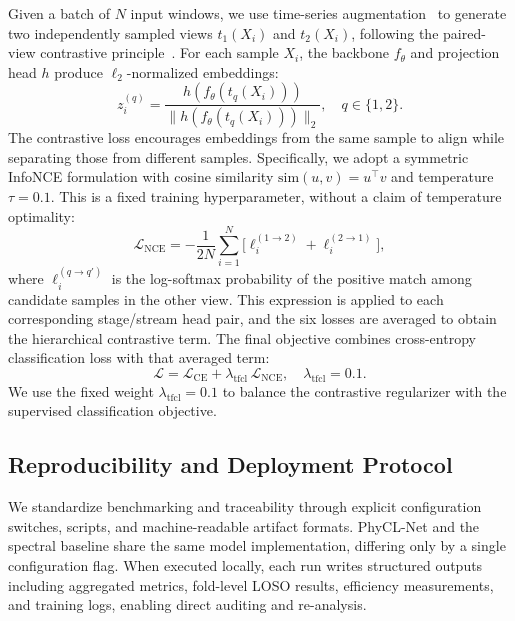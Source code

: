 \documentclass[jec]{acnsart}
\begin{document}
Given a batch of $N$ input windows, we use time-series augmentation~\cite{Iwana2021DataAugmentation} to generate two independently sampled views $t_1(X_i)$ and $t_2(X_i)$, following the paired-view contrastive principle~\cite{chen2020simclr}. For each sample $X_i$, the backbone $f_\theta$ and projection head $h$ produce $\ell_2$-normalized embeddings:
\begin{equation}
\label{eq:tfcl_embed}
z_i^{(q)}=\frac{h(f_\theta(t_q(X_i)))}{\|h(f_\theta(t_q(X_i)))\|_2}, \quad q\in\{1,2\}.
\end{equation}
The contrastive loss encourages embeddings from the same sample to align while separating those from different samples. Specifically, we adopt a symmetric InfoNCE formulation with cosine similarity $\mathrm{sim}(u,v) = u^\top v$ and temperature $\tau = 0.1$. This is a fixed training hyperparameter, without a claim of temperature optimality:
\begin{equation}
\label{eq:tfcl_infonce}
\mathcal{L}_{\mathrm{NCE}} = -\frac{1}{2N}\sum_{i=1}^{N}\bigl[\ell_i^{(1\to2)} + \ell_i^{(2\to1)}\bigr],
\end{equation}
where $\ell_i^{(q\to q')}$ is the log-softmax probability of the positive match among candidate samples in the other view. This expression is applied to each corresponding stage/stream head pair, and the six losses are averaged to obtain the hierarchical contrastive term. The final objective combines cross-entropy classification loss with that averaged term:
\begin{equation}
\label{eq:tfcl_total}
\mathcal{L} = \mathcal{L}_{\mathrm{CE}}+\lambda_{\mathrm{tfcl}}\,\mathcal{L}_{\mathrm{NCE}}, \quad \lambda_{\mathrm{tfcl}}= 0.1.
\end{equation}
We use the fixed weight $\lambda_{\mathrm{tfcl}}=0.1$ to balance the contrastive regularizer with the supervised classification objective.

\subsection{Reproducibility and Deployment Protocol}
We standardize benchmarking and traceability through explicit configuration switches, scripts, and machine-readable artifact formats. PhyCL-Net and the spectral baseline share the same model implementation, differing only by a single configuration flag. When executed locally, each run writes structured outputs including aggregated metrics, fold-level LOSO results, efficiency measurements, and training logs, enabling direct auditing and re-analysis.
\end{document}
